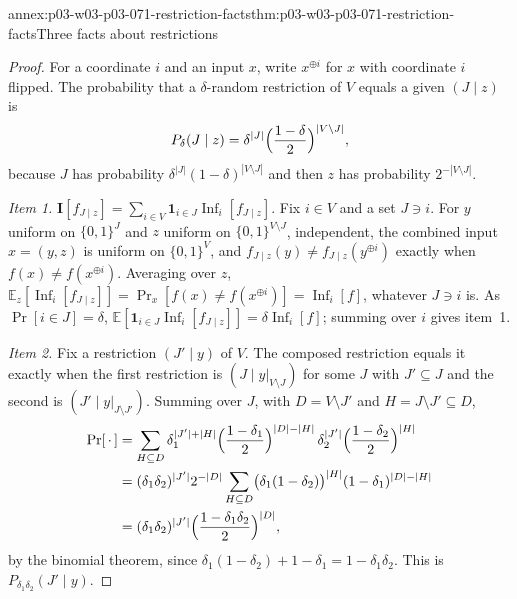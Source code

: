 \begin{annexitem}{annex:p03-w03-p03-071-restriction-facts}{thm:p03-w03-p03-071-restriction-facts}{Three facts about restrictions}
\begin{proof}
For a coordinate \(i\) and an input \(x\), write \(x^{\oplus i}\) for \(x\)
with coordinate \(i\) flipped.  The probability that a \(\delta\)-random
restriction of \(V\) equals a given \((J\mid z)\) is
\[
  P_\delta(J\mid z)=\delta^{|J|}\Bigl(\frac{1-\delta}2\Bigr)^{|V\setminus J|},
\]
because \(J\) has probability \(\delta^{|J|}(1-\delta)^{|V\setminus J|}\) and
then \(z\) has probability \(2^{-|V\setminus J|}\).

\emph{Item 1.}  \(\mathbf I[f_{J\mid z}]=\sum_{i\in V}\mathbf 1_{i\in
J}\operatorname{Inf}_i[f_{J\mid z}]\).  Fix \(i\in V\) and a set \(J\ni i\).
For \(y\) uniform on \(\{0,1\}^J\) and \(z\) uniform on
\(\{0,1\}^{V\setminus J}\), independent, the combined input \(x=(y,z)\) is
uniform on \(\{0,1\}^V\), and \(f_{J\mid z}(y)\neq f_{J\mid z}(y^{\oplus i})\)
exactly when \(f(x)\neq f(x^{\oplus i})\).  Averaging over \(z\),
\(\mathbb E_z[\operatorname{Inf}_i[f_{J\mid z}]]=\Pr_x[f(x)\neq
f(x^{\oplus i})]=\operatorname{Inf}_i[f]\), whatever \(J\ni i\) is.  As
\(\Pr[i\in J]=\delta\), \(\mathbb E[\mathbf 1_{i\in J}\operatorname{Inf}_i[f_{J\mid
z}]]=\delta\operatorname{Inf}_i[f]\); summing over \(i\) gives item~1.

\emph{Item 2.}  Fix a restriction \((J'\mid y)\) of \(V\).  The composed
restriction equals it exactly when the first restriction is
\((J\mid y|_{V\setminus J})\) for some \(J\) with \(J'\subseteq J\) and the
second is \((J'\mid y|_{J\setminus J'})\).  Summing over \(J\), with
\(D=V\setminus J'\) and \(H=J\setminus J'\subseteq D\),
\begin{align*}
  \Pr[\,\cdot\,]&=\sum_{H\subseteq D}\delta_1^{|J'|+|H|}
     \Bigl(\frac{1-\delta_1}2\Bigr)^{|D|-|H|}\,
     \delta_2^{|J'|}\Bigl(\frac{1-\delta_2}2\Bigr)^{|H|}\\
  &=(\delta_1\delta_2)^{|J'|}2^{-|D|}\sum_{H\subseteq D}
     \bigl(\delta_1(1-\delta_2)\bigr)^{|H|}(1-\delta_1)^{|D|-|H|}\\
   &=(\delta_1\delta_2)^{|J'|}\Bigl(\frac{1-\delta_1\delta_2}2\Bigr)^{|D|},
\end{align*}
by the binomial theorem, since \(\delta_1(1-\delta_2)+1-\delta_1=
1-\delta_1\delta_2\).  This is \(P_{\delta_1\delta_2}(J'\mid y)\).


\end{proof}
\end{annexitem}
